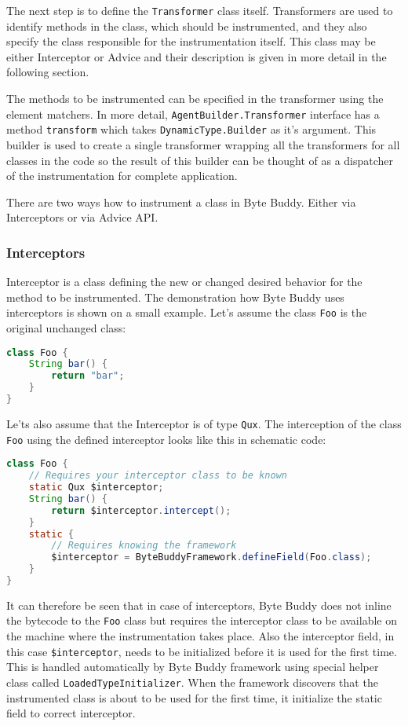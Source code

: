 The next step is to define the \texttt{Transformer} class itself. Transformers are used to identify methods in the class, which should be instrumented, and they also specify the class responsible for the instrumentation itself. This class may be either Interceptor or Advice and their description is given in more detail in the following section. 

The methods to be instrumented can be specified in the transformer using the element matchers. In more detail, \texttt{AgentBuilder.Transformer} interface has a method \texttt{transform} which takes \texttt{DynamicType.Builder} as it's argument. This builder is used to create a single transformer wrapping all the transformers for all classes in the code so the result of this builder can be thought of as a dispatcher of the instrumentation for complete application.

There are two ways how to instrument a class in Byte Buddy. Either via Interceptors or via Advice API.
\subsubsection{Interceptors}
Interceptor is a class defining the new or changed desired behavior for the method to be instrumented.  The demonstration how Byte Buddy uses interceptors is shown on a small example. Let's assume the class \texttt{Foo} is the original unchanged class:
\begin{lstlisting}[language=Java]
class Foo {
	String bar() {
		return "bar"; 
	}
}
\end{lstlisting}
	
Le'ts also assume that the Interceptor is of type \texttt{Qux}. The interception of the class \texttt{Foo} using the defined interceptor looks like this in schematic code:

\begin{lstlisting}[language=Java]
class Foo {
	// Requires your interceptor class to be known
	static Qux $interceptor;
	String bar() {
		return $interceptor.intercept(); 
	}
	static {
		// Requires knowing the framework
		$interceptor = ByteBuddyFramework.defineField(Foo.class);
	}
}
\end{lstlisting}
		
It can therefore be seen that in case of interceptors, Byte Buddy does not inline the bytecode to the \texttt{Foo} class but requires the interceptor class to be available on the machine where the instrumentation takes place. Also the interceptor field, in this case \texttt{\$interceptor}, needs to be initialized before it is used for the first time. This is handled automatically by Byte Buddy framework using special helper class called \texttt{LoadedTypeInitializer}. When the framework discovers that the instrumented class is about to be used for the first time, it initialize the static field to correct interceptor.

